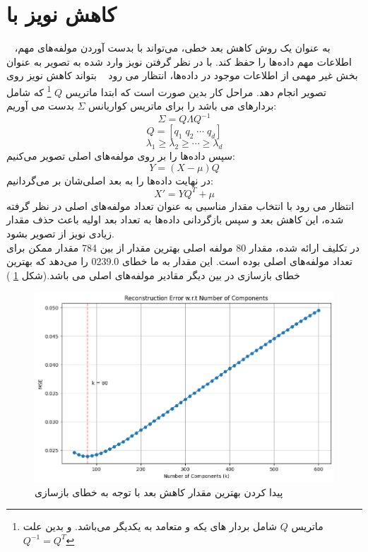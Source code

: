 \documentclass[12pt]{article}
\newcommand{\pca}{\lr{PCA}}
\begin{document}
	\section{کاهش نویز با 
		\pca
	}\label{sec: pca}
	\pca
	~ به عنوان یک روش کاهش بعد خطی، می‌تواند با بدست آوردن مولفه‌های مهم، اطلاعات مهم داده‌ها را حفظ کند. با در نظر گرفتن نویز وارد شده به تصویر به عنوان بخش غیر مهمی از اطلاعات موجود در داده‌ها، انتظار می رود \pca ~ بتواند کاهش نویز روی تصویر انجام دهد.
	مراحل کار بدین صورت است که ابتدا ماتریس $Q$
	\footnote{ماتریس 
		$Q$
		 شامل بردار های یکه و متعامد به یکدیگر می‌باشد. و بدین علت
		 $Q^{-1} = Q^T$
	}
	 که شامل بردارهای
	می باشد را برای ماتریس کواریانس 
	$\Sigma$
	بدست می ‌آوریم:
	$$
	\Sigma = Q\Lambda Q^{-1}
	$$
	$$
	Q = [q_1 \; q_2 \; \cdots \; q_d]
	$$
	$$
	\lambda_1 \geq \lambda_2 \geq \cdots \geq \lambda_d
	$$
	 سپس داده‌ها را بر روی مولفه‌های اصلی تصویر می‌کنیم:
	 $$
	 Y = (X - \mu)Q
	 $$
	 در نهایت داده‌ها را به بعد اصلی‌شان بر می‌گردانیم:
	 $$
	 X' = YQ^T‌+ \mu
	 $$
	 انتظار می رود با انتخاب مقدار مناسبی به عنوان تعداد مولفه‌های اصلی در نظر گرفته شده، این کاهش بعد و سپس بازگردانی داده‌ها به تعداد بعد اولیه باعث حذف مقدار زیادی نویز از تصویر بشود.\\
	 در تکلیف ارائه شده، مقدار 80 مولفه اصلی بهترین مقدار از بین 784 مقدار ممکن برای تعداد مولفه‌های اصلی بوده است. این مقدار به ما خطای 0239.0 را می‌دهد که بهترین خطای بازسازی در بین دیگر مقادیر مولفه‌های اصلی می باشد.(شکل 
	 \ref{fig: pca best k}
	 )
	 \begin{figure}[H]
	 	\centering
	 	\includegraphics[scale=0.6]{figs/best k pca}
	 	\caption{پیدا کردن بهترین مقدار کاهش بعد با توجه به خطای بازسازی
	 	}
	 	\label{fig: pca best k}
	 \end{figure}
\end{document}
